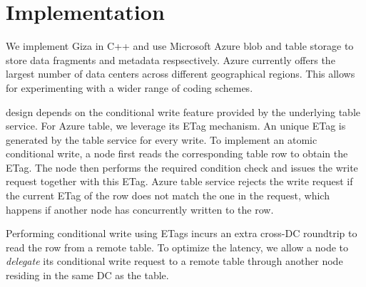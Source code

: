 \section{Implementation}
\label{sec:impl}

We implement Giza in C++ and use Microsoft Azure blob and table storage to store data fragments and metadata respsectively.
Azure currently offers the largest number of data centers across different geographical regions. This allows for experimenting 
with a wider range of coding schemes.


\name design depends on the conditional write feature provided by the underlying 
table service.
For Azure table, we leverage its ETag mechanism. An unique ETag 
is generated by the table service for every write.  To implement an atomic
conditional write, a \name node first reads the corresponding table row to
obtain the ETag. The node then performs the required condition check and issues the
write request together with this ETag.  Azure table service rejects the
write request if the current ETag of the row does not match the one in the
request, which happens if another \name node has concurrently written to the row.  

Performing conditional write using ETags 
incurs an extra cross-DC roundtrip to read the row from a remote table.
To optimize the latency, we allow a \name node to \emph{delegate} its 
conditional write request to a remote table through another node 
residing in the same DC as the table.


